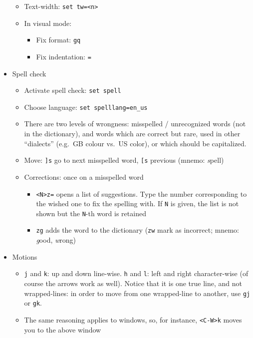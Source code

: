 \documentclass[a4paper,12pt,%
              final%
              ]{article}
\begin{document}
\begin{itemize}
\begin{itemize}
      \item Text-width: \verb|set tw=<n>|
      \item In visual mode:
        \begin{itemize}
          \item Fix format: \texttt{gq}
          \item Fix indentation: \texttt{=}
        \end{itemize}
    \end{itemize}
  \item Spell check
    \begin{itemize}
      \item Activate spell check: \verb|set spell|
      \item Choose language: \verb|set spelllang=en_us|
      \item There are two levels of wrongness: misspelled / unrecognized words (not
        in the dictionary), and words which are correct but rare, used in other
        ``dialects'' (e.g.~GB colour vs.~US color), or which should be capitalized.
      \item Move: \verb|]s| go to next misspelled word, \verb|[s| previous (mnemo:
        \emph{s}pell)
      \item Corrections: once on a misspelled word
        \begin{itemize}
          \item \verb|<N>z=| opens a list of suggestions. Type the number corresponding
            to the wished one to fix the spelling with. If \verb|N| is given, the
            list is not shown but the \verb|N|-th word is retained
          \item \verb|zg| adds the word to the dictionary (\verb|zw| mark as
            incorrect; mnemo: \emph{g}ood, \emph{w}rong)
        \end{itemize}
    \end{itemize}
  \item Motions
    \begin{itemize}
      \item \texttt{j} and \texttt{k}: up and down line-wise. \texttt{h} and
        \texttt{l}: left and right character-wise (of course the arrows work as
        well). Notice that it is one true line, and not wrapped-lines: in order to
        move from one wrapped-line to another, use \texttt{gj} or \texttt{gk}.
      \item The same reasoning applies to windows, so, for instance, \verb|<C-W>k|
        moves you to the above window

\end{itemize}
\end{itemize}
\end{document}
